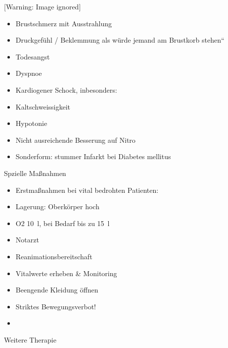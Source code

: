 \documentclass{article}
\begin{document}
\begin{center}
 [Warning: Image ignored] %

\end{center}
\begin{itemize}
\item Brustschmerz mit Ausstrahlung 

\item Druckgef\"uhl / Beklemmung {\quotedblbase}als w\"urde jemand am
Brustkorb stehen{\textquotedblleft}

\item Todesangst

\item Dyspnoe

\item Kardiogener Schock, inbesonders: 

\end{itemize}
\begin{itemize}
\item Kaltschweissigkeit

\item Hypotonie

\end{itemize}
\begin{itemize}
\item %
%
Nicht ausreichende Besserung auf Nitro

\item Sonderform: stummer Infarkt bei Diabetes  mellitus

\end{itemize}
Spzielle Ma{\ss}nahmen

\begin{itemize}
\item Erstma{\ss}nahmen bei vital bedrohten Patienten: 

\end{itemize}
\begin{itemize}
\item Lagerung: Oberk\"orper hoch

\item O2 10~l, bei Bedarf bis zu 15~l

\item Notarzt

\item Reanimationsbereitschaft

\end{itemize}
\begin{itemize}
\item Vitalwerte erheben \& Monitoring 

\item Beengende Kleidung \"offnen

\item Striktes Bewegungsverbot!

\item \end{itemize}
Weitere Therapie
\end{document}
